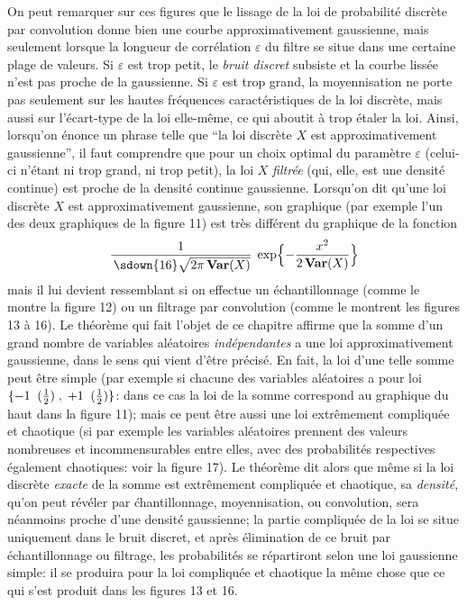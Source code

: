 On peut remarquer sur ces figures que le lissage de la loi de probabilit\'e
discr\`ete par convolution donne bien une courbe approximativement
gaus\-sienne,  mais seulement lorsque la longueur de corr\'elation
$\varepsilon$ du filtre se situe dans une certaine plage de valeurs. 
Si $\varepsilon$ est trop petit,  le {\it bruit discret} subsiste et
la courbe
liss\'ee n'est pas proche de la gaussienne.  Si $\varepsilon$
est trop grand,
 la moyennisation ne porte pas seulement sur les hautes
fr\'equences
caract\'eristiques de la loi discr\`ete,  mais aussi sur
l'\'ecart-type de la
loi elle-m\^eme,  ce qui aboutit \`a trop \'etaler la loi.
\medskip
Ainsi,  lorsqu'on \'enonce un phrase telle que ``la loi discr\`ete $X$ est
appro\-xi\-ma\-tivement gaussienne'',  il faut comprendre que pour un choix
optimal du param\`etre $\varepsilon$ (celui-ci n'\'etant ni trop grand, ni 
trop petit),  la loi $X$ {\it filtr\'ee} (qui,  elle, est une densit\'e
continue)
est proche de la densit\'e continue gaus\-sienne. 
\medskip
Lorsqu'on dit qu'une loi discr\`ete $X$ est approximativement gaussienne,
son graphique (par exemple l'un des deux graphiques de la figure 11) est
tr\`es diff\'erent du graphique de la fonction 
$${1\over\,\sdown{16}\sqrt{2\pi\, {\bf Var}(X)}}\; 
\exp \Bigl\{ - {x^2 \over 2\, {\bf
Var}(X)} \Bigr\}$$   
mais il lui devient ressemblant si on effectue un \'echantillonnage (comme
le montre la figure 12) ou un filtrage par convolution (comme le montrent
les figures 13 \`a 16). 
\bigskip
Le th\'eor\`eme qui fait l'objet de ce chapitre affirme que la somme d'un
grand nombre de variables al\'eatoires {\it ind\'ependantes} a une loi
approximativement gaussienne,  dans le sens qui vient d'\^etre pr\'ecis\'e.
En fait,  la loi d'une telle somme peut \^etre simple (par exemple si
chacune des variables al\'eatoires a pour loi $\{ -1 \;\; ({1\over 2})\; , 
\; +1\;\; ({1\over 2})\}$:  dans ce cas la loi de la somme correspond au
graphique du haut dans la figure 11);  mais ce peut \^etre aussi une loi
extr\^emement compliqu\'ee et chaotique (si par exemple les varia\-bles
al\'eatoires prennent des valeurs nombreuses et incommensurables entre
elles,  avec des probabilit\'es respectives \'egalement chaotiques: voir la
figure 17).  Le th\'eor\`eme dit alors que m\^eme si la loi discr\`ete {\it
exacte} de la somme est extr\^emement compliqu\'ee et chaotique,  sa {\it
densit\'e},  qu'on peut r\'ev\'eler par \'chantillonnage,  moyennisation, 
ou convolution,  sera n\'eanmoins
proche d'une densit\'e gaussienne; 
la partie compliqu\'ee de la loi se situe
uniquement dans le bruit discret, 
et apr\`es \'elimination de ce bruit par
\'echantillonnage ou filtrage, 
les probabilit\'es se r\'epartiront selon une
loi gaussienne simple: 
il se produira pour la loi compliqu\'ee et chaotique la m\^eme chose
que ce qui s'est produit dans les figures 13 et 16. 

